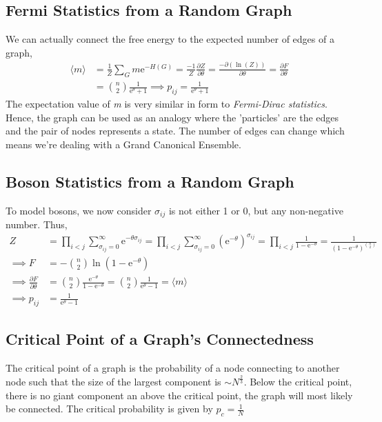 \documentclass{article}
\begin{document}
\subsection{Fermi Statistics from a Random Graph}
We can actually connect the free energy to the expected number of edges of a graph,
\begin{align*}
\langle m \rangle &= \frac{1}{Z} \sum_G m \text{e}^{-H(G)} = \frac{-1}{Z} \frac{\partial Z}{\partial \theta} = \frac{-\partial (\ln(Z))}{\partial \theta} = \frac{\partial F}{\partial \theta} \\
&= {n \choose 2} \frac{1}{\text{e}^{\theta} +1} \implies p_{ij} = \frac{1}{\text{e}^{\theta} +1}
\end{align*}
The expectation value of {\it m} is very similar in form to {\it Fermi-Dirac statistics}. Hence, the graph can be used as an analogy where the 'particles' are the edges and the pair of nodes represents a state. The number of edges can change which means we're dealing with a Grand Canonical Ensemble. 


\subsection{Boson Statistics from a Random Graph}
To model bosons, we now consider $\sigma_{ij}$ is not either 1 or 0, but any non-negative number. Thus, 
\begin{align*}
Z &= \prod_{i<j} \sum_{\sigma_{ij} = 0}^{\infty} \text{e}^{-\theta \sigma_{ij}} = \prod_{i<j} \sum_{\sigma_{ij} = 0}^{\infty} \left(\text{e}^{-\theta}\right)^{\sigma_{ij}} = \prod_{i<j} \frac{1}{1 - \text{e}^{-\theta}} = \frac{1}{(1 - \text{e}^{-\theta})^{{n \choose 2}}} \\
\implies F &= -{n \choose 2} \ln(1-\text{e}^{-\theta}) \\
\implies \frac{\partial F}{\partial \theta} &= {n \choose 2} \frac{\text{e}^{-\theta}}{1-\text{e}^{-\theta}} = {n \choose 2} \frac{1}{\text{e}^{\theta}-1} = \langle m \rangle \\
\implies p_{ij} &= \frac{1}{\text{e}^{\theta}-1}
\end{align*}

\subsection{Critical Point of a Graph's Connectedness}

The critical point of a graph is the probability of a node connecting to another node such that the size of the largest component is $\sim N^{\frac23}$. Below the critical point, there is no giant component an above the critical point, the graph will most likely be connected. The critical probability is given by $p_c = \frac1N$
\end{document}
